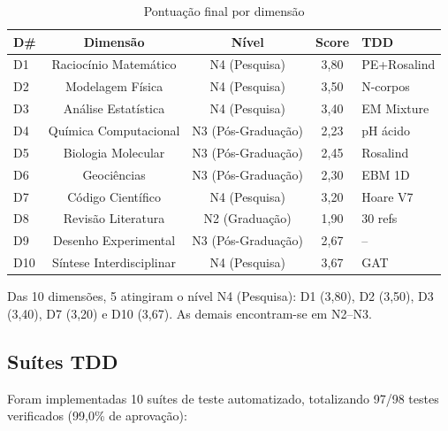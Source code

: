 \documentclass[12pt,a4paper]{article}
\begin{document}
\begin{table}[H]
\centering
\caption{Pontuação final por dimensão}
\label{tab:scores}
\begin{tabular}{lcccl}
\toprule
\textbf{D\#} & \textbf{Dimensão} & \textbf{Nível} & \textbf{Score} & \textbf{TDD} \\
\midrule
D1  & Raciocínio Matemático      & N4 (Pesquisa)        & 3,80 & PE+Rosalind \\
D2  & Modelagem Física           & N4 (Pesquisa)        & 3,50 & N-corpos \\
D3  & Análise Estatística        & N4 (Pesquisa)        & 3,40 & EM Mixture \\
D4  & Química Computacional      & N3 (Pós-Graduação)   & 2,23 & pH ácido   \\
D5  & Biologia Molecular         & N3 (Pós-Graduação)   & 2,45 & Rosalind   \\
D6  & Geociências                & N3 (Pós-Graduação)   & 2,30 & EBM 1D     \\
D7  & Código Científico          & N4 (Pesquisa)        & 3,20 & Hoare V7   \\
D8  & Revisão Literatura         & N2 (Graduação)       & 1,90 & 30 refs    \\
D9  & Desenho Experimental       & N3 (Pós-Graduação)   & 2,67 & --         \\
D10 & Síntese Interdisciplinar   & N4 (Pesquisa)        & 3,67 & GAT        \\
\bottomrule
\end{tabular}
\end{table}

Das 10 dimensões, 5 atingiram o nível N4 (Pesquisa): D1 (3,80), D2 (3,50),
D3 (3,40), D7 (3,20) e D10 (3,67). As demais encontram-se em N2--N3.

\subsection{Suítes TDD}

Foram implementadas 10 suítes de teste automatizado, totalizando 97/98 testes
verificados (99,0\% de aprovação):
\end{document}
